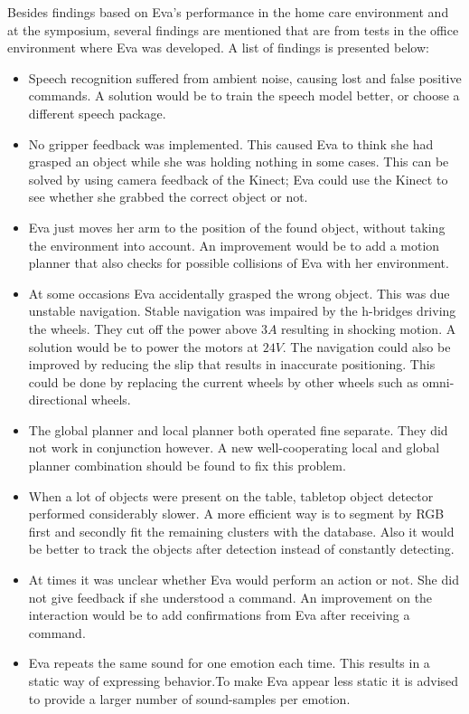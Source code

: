 \documentclass[project_eva.tex]{subfiles}
\begin{document}
Besides findings based on Eva's performance in the home care environment and at the symposium, several findings are mentioned that are from tests in the office environment where Eva was developed. A list of findings is presented below:

\begin{itemize}
\item Speech recognition suffered from ambient noise, causing lost and false positive commands. A solution would be to train the speech model better, or choose a different speech package. 
\item No gripper feedback was implemented. This caused Eva to think she had grasped an object while she was holding nothing in some cases. This can be solved by using camera feedback of the Kinect; Eva could use the Kinect to see whether she grabbed the correct object or not.
\item Eva just moves her arm to the position of the found object, without taking the environment into account. An improvement would be to add a motion planner that also checks for possible collisions of Eva with her environment.
\item  At some occasions Eva accidentally grasped the wrong object. This was due unstable navigation. Stable navigation was impaired by the h-bridges driving the wheels. They cut off the power above $3A$ resulting in shocking motion. A solution would be to power the motors at $24V$. The navigation could also be improved by reducing the slip  that results in inaccurate positioning. This could be done by replacing the current wheels by other wheels such as omni-directional wheels.
\item The global planner and local planner both operated fine separate. They did not work in conjunction however. A new well-cooperating local and global planner combination should be found to fix this problem.  
\item When a lot of objects were present on the table, tabletop object detector performed considerably slower. A more efficient way is to segment by RGB first and secondly fit the remaining clusters with the database. Also it would be better to track the objects after detection instead of constantly detecting.
\item At times it was unclear whether Eva would perform an action or not. She did not give feedback if she understood a command. An improvement on the interaction would be to add confirmations from Eva after receiving a command.
\item Eva repeats the same sound for one emotion each time. This results in a static way of expressing behavior.To make Eva appear less static it is advised to provide a larger number of sound-samples per emotion.

\end{itemize}
\end{document}
